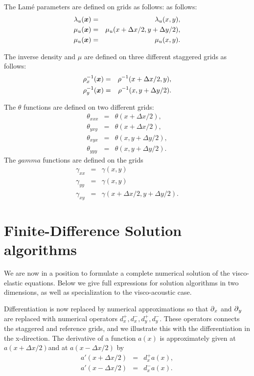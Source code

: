 \documentclass[11pt]{article}
\begin{document}
The Lam\'{e} parameters are defined on grids as follows:
as follows:
%
\begin{eqnarray}
   \lambda_u(\mbox{\boldmath $x$}) & = & \lambda_u(x,y),\\
   \mu_u(\mbox{\boldmath $x$})     & = & \mu_u(x+\Delta x/2,y+\Delta y/2), \nonumber\\
   \mu_u(\mbox{\boldmath $x$})     & = & \mu_u(x,y).
\end{eqnarray}

The inverse density and $\mu$ are defined  on three different staggered grids as follows:
\begin{eqnarray}
   \rho_x^{-1}(\mbox{\boldmath $x$}) & = & \rho^{-1}(x+\Delta x/2, y),       \nonumber\\
   \rho_y^{-1}(\mbox{\boldmath $x$}) & = & \rho^{-1}(x,y+\Delta y/2).        \nonumber
\end{eqnarray}

The $\theta$ functions are defined on two different grids:
\begin{eqnarray}
   \theta_{xxx} & = & \theta(x+\Delta x/2),\\
   \theta_{yxy} & = & \theta(x+\Delta x/2),\\
   \theta_{xyx} & = & \theta(x,y+\Delta y/2),\\
   \theta_{yyy} & = & \theta(x,y+\Delta y/2).
\end{eqnarray}
The $gamma$ functions are defined on the grids
\begin{eqnarray}
   \gamma_{xx} & = & \gamma(x,y)\\
   \gamma_{yy} & = & \gamma(x,y)\\
   \gamma_{xy} & = & \gamma(x+\Delta x/2,y+\Delta y/2).
\end{eqnarray}

\section{Finite-Difference Solution algorithms}
We are now in a position to formulate a complete numerical 
solution of the visco-elastic equations.
Below we give full expressions for
solution algorithms in two dimensions, as well
as specialization to the visco-acoustic case.

Differentiation is now replaced by numerical approximations so 
that $\mbox{$\partial$}_x$ and $\mbox{$\partial$}_y$ 
are replaced with numerical operators $d^+_x,d^-_x,d^+_y,d^-_y$.
These operators connects the staggered and reference grids, and we 
illustrate this with the differentiation
in the x-direction.
The derivative of a function $a(x)$ is approximately given at 
$a(x+\Delta x/2)$and
at $a(x-\Delta x/2)$ by
\begin{eqnarray}
a'(x+\Delta x/2) & = & d^+_x a(x),\nonumber\\
a'(x-\Delta x/2) & = & d^-_x a(x).
\end{eqnarray}
\end{document}
